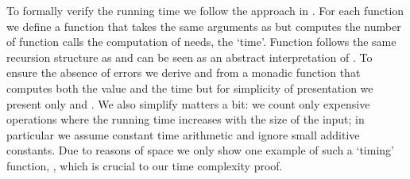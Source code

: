 \begin{isabellebody}
\begin{isamarkuptext}
To formally verify the running time we follow the approach in \cite{Nipkow-APLAS17}.
For each function  we define a function  that takes the same arguments as
 but computes the number of function calls the computation of  needs, the `time'.
Function  follows the same recursion structure as  and can be seen as an
abstract interpretation of . To ensure the absence of errors we derive  and
 from a monadic function that computes both the value and the time but for simplicity of
presentation we present only  and . We also simplify matters a bit: we count
only expensive operations where the running time increases with the size of the input; in particular
we assume constant time arithmetic and ignore small additive constants. Due to reasons of space we
only show one example of such a `timing' function, , which is crucial to our
time complexity proof.


\end{isamarkuptext}
\end{isabellebody}
